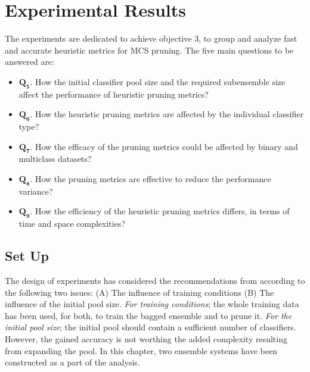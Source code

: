 %
%
\section{Experimental Results}
\label{sec:6_2_methodology}

The experiments are dedicated to achieve objective 3, to group and analyze fast and accurate heuristic metrics for MCS pruning. The five main questions to be answered are:

\begin{itemize}[nosep]
\setlength{\itemindent}{-.5in}
    \item $\pmb{Q_5}$. How the initial classifier pool size and the required subensemble size affect the performance of heuristic pruning metrics?
    \item  $\pmb{Q_6}$. How the heuristic pruning metrics are affected by the individual classifier type? 
    \item $\pmb{Q_7}$. How the efficacy of the pruning metrics could be affected by binary and multiclass datasets?   
     \item $\pmb{Q_8}$. How the pruning metrics are effective to reduce the performance variance?
     \item $\pmb{Q_9}$. How the efficiency of the heuristic pruning metrics differs, in terms of time and space complexities?
\end{itemize}


\subsection{Set Up} \label{ch6_setup}
The design of experiments has considered the recommendations from \cite{martinez2009} according to the following two issues: (A) The influence of training conditions (B) The influence of the initial pool size. \textit{For training conditions}; the whole training data has been used, for both, to train the bagged ensemble and to prune it. \textit{For the initial pool size}; the initial pool should contain a sufficient number of classifiers. However, the gained accuracy is not worthing the added complexity resulting from expanding the pool. In this chapter, two ensemble systems have been constructed as a part of the analysis. 
 
